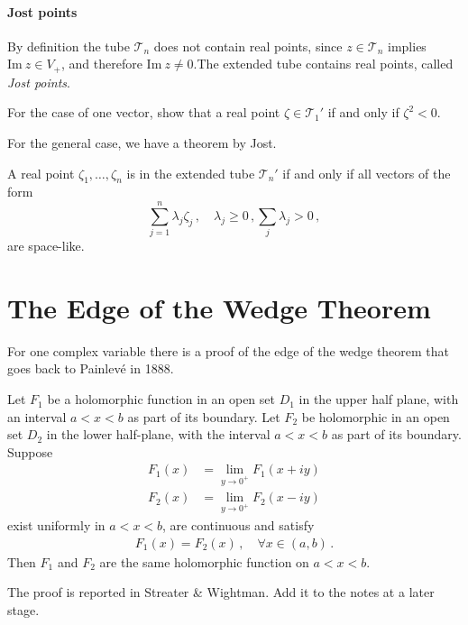 \paragraph{Jost points}

By definition the tube $\mathcal{T}_n$ does not contain real points, 
since $z \in \mathcal{T}_n$ implies $\mathrm{Im}\ z \in V_+$, and 
therefore $\mathrm{Im}\ z \neq 0$.The extended tube contains real points, 
called {\em Jost points}. 

\begin{Ex}
    For the case of one vector, show that a real point 
    $\zeta \in \mathcal{T}_1'$ if and only if $\zeta^2 < 0$.
\end{Ex}

For the general case, we have a theorem by Jost. 
\begin{Thm}
    A real point $\zeta_1,\ldots,\zeta_n$ is in the extended tube
    $\mathcal{T}_n'$ if and only if all vectors of the form 
    \[
     \sum_{j=1}^n \lambda_j \zeta_j\, , \quad \lambda_j\geq 0\, , \sum_j \lambda_j >0\, ,
    \]
    are space-like.
\end{Thm}

\section{The Edge of the Wedge Theorem}
\label{eq:EdgeOfTheWedge}

For one complex variable there is a proof of the edge of the wedge 
theorem that goes back to Painlev\'e in 1888. 

\begin{Thm}
    Let $F_1$ be a holomorphic function in an open set $D_1$ in the upper half
    plane, with an interval $a<x<b$ as part of its boundary. Let $F_2$ be
    holomorphic in an open set $D_2$ in the lower half-plane, with the interval
    $a<x<b$ as part of its boundary. Suppose 
    \begin{align}
        F_1(x) &= \lim_{y\to 0^+} F_1(x+iy) \nonumber \\
        F_2(x) &= \lim_{y\to 0^+} F_2(x-iy) \nonumber 
    \end{align}
    exist uniformly in $a<x<b$, are continuous and satisfy
    \begin{align}
        F_1(x) = F_2(x)\, , \quad \forall x\in (a,b)\, .
    \end{align}
    Then $F_1$ and $F_2$ are the same holomorphic function on 
    $a<x<b$.
\end{Thm}
The proof is reported in Streater \& Wightman. Add it to the notes at a later
stage. 

